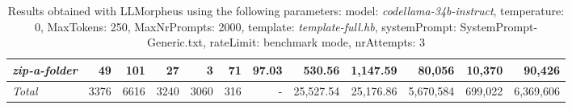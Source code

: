 \begin{table*}
{\begin{tabular}{l||r|r|r|r|r|r||r|r||r|r|r}
   \hline
   \textit{zip-a-folder} & 49 & 101 & 27 & 3 & 71 & 97.03 & 530.56 & 1,147.59 & 80,056 & 10,370 & 90,426 \\ 
   \hline
   \textit{Total} & 3376 & 6616 & 3240 & 3060 & 316 & - & 25,527.54  & 25,176.86 & 5,670,584 & 699,022 & 6,369,606 \\ 
 \end{tabular}
 }
 \caption{Results obtained with LLMorpheus using the following parameters: 
   model: \textit{codellama-34b-instruct}, 
   temperature: 0, 
   MaxTokens: 250, 
   MaxNrPrompts: 2000, 
   template: \textit{template-full.hb}, 
   systemPrompt: SystemPrompt-Generic.txt, 
   rateLimit: benchmark mode, 
   nrAttempts: 3  
 }
\end{table*}

